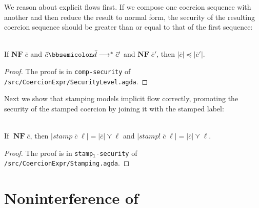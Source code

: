 We reason about explicit flows first. If we compose one coercion
sequence with another and then reduce the result to normal form, the
security of the resulting coercion sequence should be greater than or
equal to that of the first sequence:

\begin{lemma}\ \\
  \label{lem:comp-explicit}
  If $\mathbf{NF} \; \bar{c}$
  and $\bar{c} \mdoubleplus \bar{d} \longrightarrow^{*} \bar{c}'$
  and $\mathbf{NF} \; \bar{c}'$,
  then $|\bar{c}| \preccurlyeq |\bar{c}'|$.
\end{lemma}
\begin{proof}
  The proof is in \texttt{comp-security} of \texttt{/src/CoercionExpr/SecurityLevel.agda}.
\end{proof}

Next we show that stamping models implicit flow correctly, promoting
the security of the stamped coercion by joining it with the stamped
label:

\begin{lemma}\ \\
  \label{lem:stamp-implicit}
  If $\;\mathbf{NF}\; \bar{c}$,
  then $| \mathit{stamp} \; \bar{c} \; \ell| = |\bar{c}| \curlyvee \ell$
  and $| \mathit{stamp!} \; \bar{c} \; \ell| = |\bar{c}| \curlyvee \ell$.
\end{lemma}
\begin{proof}
  The proof is in \texttt{stamp$_{\mathtt{l}}$-security} of \texttt{/src/CoercionExpr/Stamping.agda}.
\end{proof}

\section{Noninterference of \DynIFC}
\label{sec:NI-dynifc}

